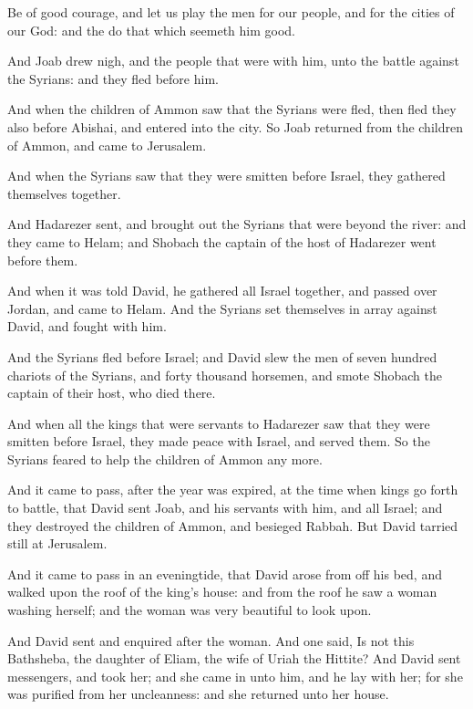 \Verse Be of good courage, and let us play the men for our people, and for the cities of our God: and the \LORD do that which seemeth him good.

\Verse And Joab drew nigh, and the people that were with him, unto the battle against the Syrians: and they fled before him.

\Verse And when the children of Ammon saw that the Syrians were fled, then fled they also before Abishai, and entered into the city. So Joab returned from the children of Ammon, and came to Jerusalem.

\Verse And when the Syrians saw that they were smitten before Israel, they gathered themselves together.

\Verse And Hadarezer sent, and brought out the Syrians that were beyond the river: and they came to Helam; and Shobach the captain of the host of Hadarezer went before them.

\Verse And when it was told David, he gathered all Israel together, and passed over Jordan, and came to Helam. And the Syrians set themselves in array against David, and fought with him.

\Verse And the Syrians fled before Israel; and David slew the men of seven hundred chariots of the Syrians, and forty thousand horsemen, and smote Shobach the captain of their host, who died there.

\Verse And when all the kings that were servants to Hadarezer saw that they were smitten before Israel, they made peace with Israel, and served them. So the Syrians feared to help the children of Ammon any more.


\Chapter
\Verse And it came to pass, after the year was expired, at the time when kings go forth to battle, that David sent Joab, and his servants with him, and all Israel; and they destroyed the children of Ammon, and besieged Rabbah. But David tarried still at Jerusalem.

\Verse And it came to pass in an eveningtide, that David arose from off his bed, and walked upon the roof of the king's house: and from the roof he saw a woman washing herself; and the woman was very beautiful to look upon.

\Verse And David sent and enquired after the woman. And one said, Is not this Bathsheba, the daughter of Eliam, the wife of Uriah the Hittite?  \Verse And David sent messengers, and took her; and she came in unto him, and he lay with her; for she was purified from her uncleanness: and she returned unto her house.

